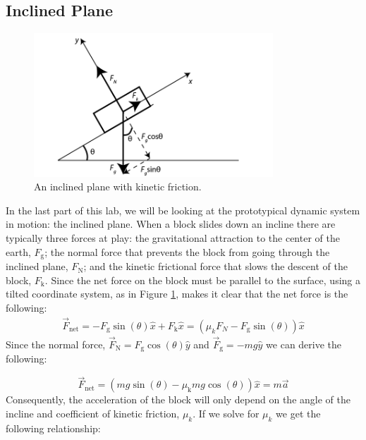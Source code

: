 \subsection{Inclined Plane}
\begin{figure}[h]
    \begin{center}
        \includegraphics[width=0.8\textwidth]{./Exp3/pic/image16.png}
    \end{center}
    \caption{An inclined plane with kinetic friction.}
    \label{fig:plane}
\end{figure}
In the last part of this lab, we will be looking at the prototypical dynamic system in motion: the inclined plane.  When a block slides down an incline there are typically three forces at play: the gravitational attraction to the center of the earth, $F_\text{g}$; the normal force that prevents the block from going through the inclined plane, $F_\text{N}$; and the kinetic frictional force that slows the descent of the block, $F_\text{k}$.  Since the net force on the block must be parallel to the surface, using a tilted coordinate system, as in Figure \ref{fig:plane}, makes it clear that the net force is the following:
\begin{gather}
\vec F_{\text{net}} = - F_{\text{g}} \sin(\theta) \hat x + F_{\text{k}} \hat x = \left ( \mu_k F_N-F_{\text{g}} \sin(\theta)\right ) \hat x
\end{gather}
Since the normal force, $\vec F_\text{N} = F_\text{g} \cos(\theta) \hat y$ and $\vec F_\text{g} = -m g \hat y$ we can derive the following:

\begin{equation}
\vec F_{\text{net}} = \left ( mg \sin(\theta) - \mu_\text{k} m g \cos(\theta) \right ) \hat x= m\vec a
\end{equation}
\noindent Consequently, the acceleration of the block will only depend on the angle of the incline and coefficient of kinetic friction, $\mu_k$. If we solve for $\mu_k$ we get the following relationship:

